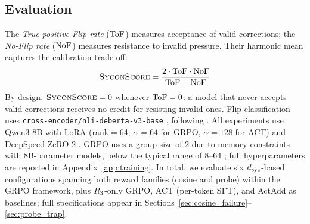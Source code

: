 \subsection{Evaluation}
\label{ssec:eval}

The \emph{True-positive Flip rate} ($\text{ToF}$) measures acceptance of valid corrections; the \emph{No-Flip rate} ($\text{NoF}$) measures resistance to invalid pressure.
Their harmonic mean captures the calibration trade-off:
\begin{equation}
\label{eq:sycon}
\textsc{SyconScore} = \frac{2 \cdot \text{ToF} \cdot \text{NoF}}{\text{ToF} + \text{NoF}}
\end{equation}
By design, $\textsc{SyconScore} = 0$ whenever $\text{ToF} = 0$: a model that never accepts valid corrections receives no credit for resisting invalid ones.
Flip classification uses \texttt{cross-encoder/nli-deberta-v3-base} \citep{he2023debertav3}, following \citet{consistency2025bctact}.
All experiments use Qwen3-8B \citep{yang2025qwen3} with LoRA \citep{hu2022lora} (rank$=$64; $\alpha{=}64$ for GRPO, $\alpha{=}128$ for ACT) and DeepSpeed ZeRO-2 \citep{rajbhandari2020zero}.
GRPO uses a group size of 2 due to memory constraints with 8B-parameter models, below the typical range of 8--64 \citep{shao2024grpo}; full hyperparameters are reported in Appendix~\ref{app:training}.
In total, we evaluate six $d_{\text{syc}}$-based configurations spanning both reward families (cosine and probe) within the GRPO framework, plus $R_3$-only GRPO, ACT (per-token SFT), and ActAdd as baselines; full specifications appear in Sections~\ref{sec:cosine_failure}--\ref{sec:probe_trap}.
